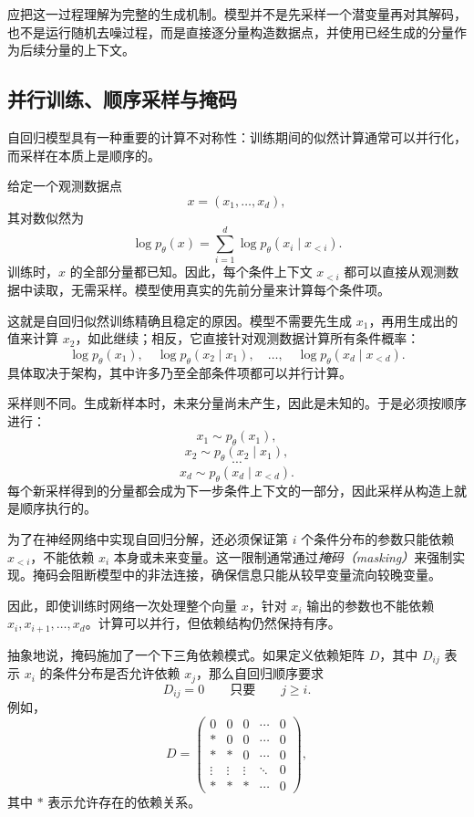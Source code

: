 应把这一过程理解为完整的生成机制。模型并不是先采样一个潜变量再对其解码，也不是运行随机去噪过程，而是直接逐分量构造数据点，并使用已经生成的分量作为后续分量的上下文。

\subsection{并行训练、顺序采样与掩码}

自回归模型具有一种重要的计算不对称性：训练期间的似然计算通常可以并行化，而采样在本质上是顺序的。

给定一个观测数据点
\[
x=(x_1,\dots,x_d),
\]
其对数似然为
\[
\log p_\theta(x)
=
\sum_{i=1}^d
\log p_\theta(x_i\mid x_{<i}).
\]
训练时，$x$ 的全部分量都已知。因此，每个条件上下文 $x_{<i}$ 都可以直接从观测数据中读取，无需采样。模型使用真实的先前分量来计算每个条件项。

这就是自回归似然训练精确且稳定的原因。模型不需要先生成 $x_1$，再用生成出的值来计算 $x_2$，如此继续；相反，它直接针对观测数据计算所有条件概率：
\[
\log p_\theta(x_1),
\quad
\log p_\theta(x_2\mid x_1),
\quad
\dots,
\quad
\log p_\theta(x_d\mid x_{<d}).
\]
具体取决于架构，其中许多乃至全部条件项都可以并行计算。

采样则不同。生成新样本时，未来分量尚未产生，因此是未知的。于是必须按顺序进行：
\[
x_1\sim p_\theta(x_1),
\]
\[
x_2\sim p_\theta(x_2\mid x_1),
\]
\[
\cdots
\]
\[
x_d\sim p_\theta(x_d\mid x_{<d}).
\]
每个新采样得到的分量都会成为下一步条件上下文的一部分，因此采样从构造上就是顺序执行的。

为了在神经网络中实现自回归分解，还必须保证第 $i$ 个条件分布的参数只能依赖 $x_{<i}$，不能依赖 $x_i$ 本身或未来变量。这一限制通常通过\emph{掩码（masking）}来强制实现。掩码会阻断模型中的非法连接，确保信息只能从较早变量流向较晚变量。

因此，即使训练时网络一次处理整个向量 $x$，针对 $x_i$ 输出的参数也不能依赖 $x_i,x_{i+1},\dots,x_d$。计算可以并行，但依赖结构仍然保持有序。

抽象地说，掩码施加了一个下三角依赖模式。如果定义依赖矩阵 $D$，其中 $D_{ij}$ 表示 $x_i$ 的条件分布是否允许依赖 $x_j$，那么自回归顺序要求
\[
D_{ij}=0
\qquad
\text{只要}
\qquad
j\geq i.
\]
例如，
\[
D
=
\begin{pmatrix}
0      & 0      & 0      & \cdots & 0 \\
\ast   & 0      & 0      & \cdots & 0 \\
\ast   & \ast   & 0      & \cdots & 0 \\
\vdots & \vdots & \vdots & \ddots & 0 \\
\ast   & \ast   & \ast   & \cdots & 0
\end{pmatrix},
\]
其中 $\ast$ 表示允许存在的依赖关系。

